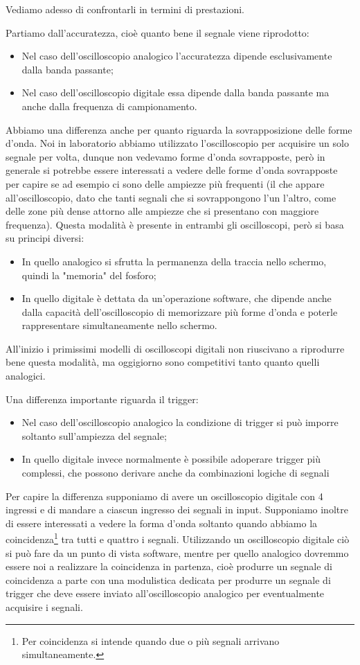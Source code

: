 Vediamo adesso di confrontarli in termini di prestazioni.

Partiamo dall'accuratezza, cioè quanto bene il segnale viene riprodotto:
\begin{itemize}[leftmargin=0.5cm]
   \item Nel caso dell'oscilloscopio analogico l'accuratezza dipende esclusivamente dalla banda passante;
   \item Nel caso dell'oscilloscopio digitale essa dipende dalla banda passante ma anche dalla frequenza di campionamento.
\end{itemize}
Abbiamo una differenza anche per quanto riguarda la sovrapposizione delle forme d'onda. Noi in laboratorio abbiamo utilizzato l'oscilloscopio per acquisire un solo segnale per volta, dunque non vedevamo forme d'onda sovrapposte, però in generale si potrebbe essere interessati a vedere delle forme d'onda sovrapposte per capire se ad esempio ci sono delle ampiezze più frequenti (il che appare all'oscilloscopio, dato che tanti segnali che si sovrappongono l'un l'altro, come delle zone più dense attorno alle ampiezze che si presentano con maggiore frequenza). Questa modalità è presente in entrambi gli oscilloscopi, però si basa su principi diversi:
\begin{itemize}[leftmargin=0.5cm]
   \item In quello analogico si sfrutta la permanenza della traccia nello schermo, quindi la "memoria" del fosforo;
   \item In quello digitale è dettata da un'operazione software, che dipende anche dalla capacità dell'oscilloscopio di memorizzare più forme d'onda e poterle rappresentare simultaneamente nello schermo.
\end{itemize}
All'inizio i primissimi modelli di oscilloscopi digitali non riuscivano a riprodurre bene questa modalità, ma oggigiorno sono competitivi tanto quanto quelli analogici.

Una differenza importante riguarda il trigger:
\begin{itemize}[leftmargin=0.5cm]
   \item Nel caso dell'oscilloscopio analogico la condizione di trigger si può imporre soltanto sull'ampiezza del segnale;
   \item In quello digitale invece normalmente è possibile adoperare trigger più complessi, che possono derivare anche da combinazioni logiche di segnali
\end{itemize}
Per capire la differenza supponiamo di avere un oscilloscopio digitale con 4 ingressi e di mandare a ciascun ingresso dei segnali in input. Supponiamo inoltre di essere interessati a vedere la forma d'onda soltanto quando abbiamo la coincidenza\footnote{Per coincidenza si intende quando due o più segnali arrivano simultaneamente.} tra tutti e quattro i segnali. Utilizzando un oscilloscopio digitale ciò si può fare da un punto di vista software, mentre per quello analogico dovremmo essere noi a realizzare la coincidenza in partenza, cioè produrre un segnale di coincidenza a parte con una modulistica dedicata per produrre un segnale di trigger che deve essere inviato all'oscilloscopio analogico per eventualmente acquisire i segnali.

